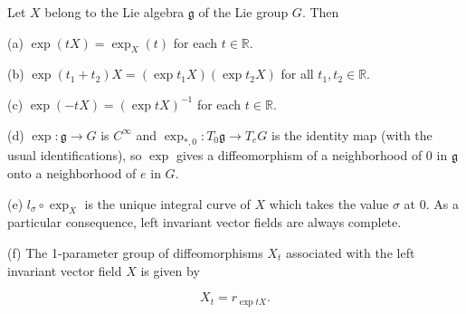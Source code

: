 \begin{theorem}\label{thm:3.31}
Let $X$ belong to the Lie algebra $\mathfrak{g}$ of the Lie group $G$. Then

(a)  $ \exp(tX) = \exp_X(t) $ for each  $ t \in \mathbb{R} $.

(b)  $ \exp(t_{1}+t_{2})X=(\exp t_{1}X)(\exp t_{2}X) $ for all $t_{1},t_{2}\in\mathbb{R}$.

(c)  $ \exp(-tX) = (\exp tX)^{-1} $ for each  $ t \in \mathbb{R} $.

(d) $\exp: \mathfrak{g} \to G$ is $C^{\infty}$ and $\exp_{*,0}\colon T_0\mathfrak{g}\to T_{e} G$ is the identity map (with the usual identifications), so $\exp$ gives a diffeomorphism of a neighborhood of 0 in $\mathfrak{g}$ onto a neighborhood of $e$ in $G$.

(e) $l_{\sigma}\circ\exp_{X}$ is the unique integral curve of $X$ which takes the value $\sigma$ at 0. As a particular consequence, left invariant vector fields are always complete.

(f) The 1-parameter group of diffeomorphisms $X_{t}$ associated with the left invariant vector field $X$ is given by

\[
X_{t}=r_{\exp tX}.
\]

\end{theorem}

